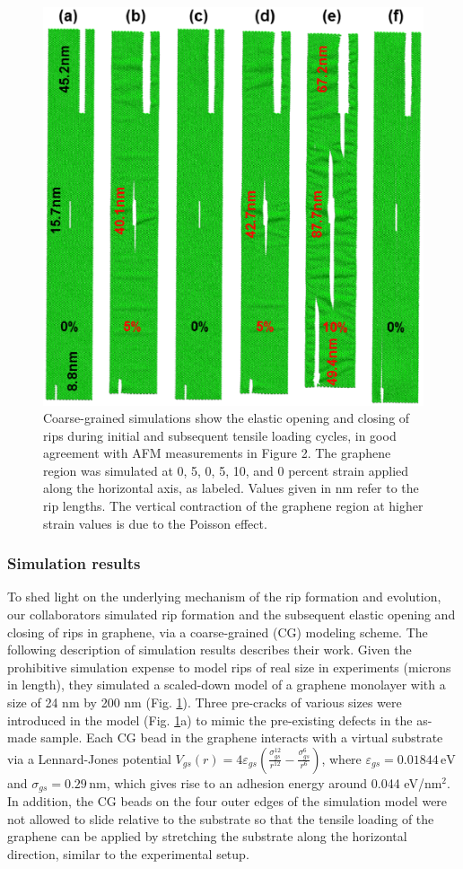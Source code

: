 \documentclass[edeposit,fullpage,draftthesis]{uiucthesis2009}
\begin{document}
        \begin{figure}
        \centering
        \includegraphics[width=0.5\linewidth]{images/resultsanddiscussion/rippingpaper/Figure4.eps}
        \caption[Simulations of rip formation in uniaxially strained graphene]
            {Coarse-grained simulations show the elastic opening and closing of
            rips during initial and subsequent tensile loading cycles, in good agreement
            with AFM measurements in Figure 2. The graphene region was simulated at 0, 5,
            0, 5, 10, and 0 percent strain applied along the horizontal axis, as labeled.
            Values given in nm refer to the rip lengths. The vertical contraction of the
            graphene region at higher strain values is due to the Poisson effect.}
        \label{fig:rip-simulation}
        \end{figure}
       
        \subsubsection*{Simulation results}
        
        To shed light on the underlying mechanism of the rip formation and evolution,
        our collaborators simulated rip formation and the subsequent elastic opening and closing of
        rips in graphene, via a coarse-grained (CG) modeling scheme\cite{Zhu2014}.
        The following description of simulation results describes their work.
        Given the prohibitive simulation expense to model rips of real size in
        experiments (microns in length), they simulated a scaled-down model of a graphene
        monolayer with a size of 24 nm by 200 nm (Fig. \ref{fig:rip-simulation}). Three pre-cracks of various
        sizes were introduced in the model (Fig. \ref{fig:rip-simulation}a) to mimic the pre-existing defects
        in the as-made sample. Each CG bead in the graphene interacts with a virtual
        substrate via a Lennard-Jones potential\cite{Scharfenberg2011} $V_{gs}(r)
        =4\varepsilon_{gs} \left( \frac{\sigma_{gs}^{12}}{r^{12}} -
        \frac{\sigma_{gs}^6}{r^6} \right)$, where $\varepsilon_{gs}=0.01844 \,
        \text{eV}$ and $\sigma_{gs}=0.29 \, \text{nm}$, which gives rise to an adhesion
        energy around 0.044 eV/nm$^{2}$. In addition, the CG beads on the four outer
        edges of the simulation model were not allowed to slide relative to the
        substrate so that the tensile loading of the graphene can be applied by
        stretching the substrate along the horizontal direction, similar to the
        experimental setup.
        
\end{document}
